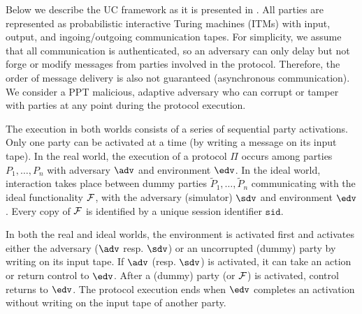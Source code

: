 Below we describe the UC framework as it is presented in \cite{EPRINT:CLOS02}. 
All parties are represented as probabilistic interactive Turing machines (ITMs) with input, output, and ingoing/outgoing communication tapes. For simplicity, we assume that all communication is authenticated, so an adversary can only delay but not forge or modify messages from parties involved in the protocol. Therefore, the order of message delivery is also not guaranteed (asynchronous communication). We consider a PPT malicious, adaptive adversary who can corrupt or tamper with parties at any point during the protocol execution.

The execution in both worlds consists of a series of sequential party activations. Only one party can be activated at a time (by writing a message on its input tape). In the real world, the execution of a protocol $\Pi$ occurs among parties $P_1, \dots, P_n$ with adversary $\adv$ and environment $\env$. In the ideal world, interaction takes place between dummy parties $\tilde{P}_1, \dots, \tilde{P}_n$ communicating with the ideal functionality $\mathcal{F}$, with the adversary (simulator) $\Sim$ and environment $\env$. Every copy of $\mathcal{F}$ is identified by a unique session identifier $\texttt{sid}$. 

In both the real and ideal worlds, the environment is activated first and activates either the adversary ($\adv$ resp. $\Sim$) or an uncorrupted (dummy) party by writing on its input tape. If $\adv$ (resp. $\Sim$) is activated, it can take an action or return control to $\env$. After a (dummy) party (or $\mathcal{F}$) is activated, control returns to $\env$. The protocol execution ends when $\env$ completes an activation without writing on the input tape of another party.

